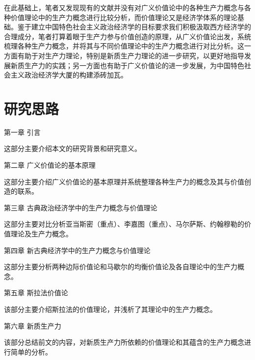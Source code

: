 在此基础上，笔者又发现现有的文献并没有对广义价值论中的各种生产力概念与各种价值理论中的生产力概念进行比较分析，而价值理论又是经济学体系的理论基础\cite[118]{CaiJiMingCongGuDianZhengZhiJingJiXueDaoZhongGuoTeSeSheHuiZhuYiZhengZhiJingJiXueJiYuZhongGuoShiJiaoDeZhengZhiJingJiXueYanBianShangCe2023}。鉴于建立中国特色社会主义政治经济学的目标要求我们积极汲取西方经济学的合理成分\cite[81]{ChengEnFuChongJianZhongGuoJingJiXueChaoYueMaKeSiYuXiFangJingJiXue2000}，笔者打算着眼于生产力参与价值创造的原理，从广义价值论出发，系统梳理各种生产力概念，并将其与不同价值理论中的生产力概念进行对比分析。这一方面有助于对生产力理论，特别是新质生产力理论的进一步研究，以更好地指导发展新质生产力的实践；另一方面也有助于广义价值论的进一步发展，为中国特色社会主义政治经济学大厦的构建添砖加瓦。


\section{研究思路}

第一章 \quad 引言

这部分主要介绍本文的研究背景和研究意义。

第二章 \quad 广义价值论的基本原理

这部分主要介绍广义价值论的基本原理并系统整理各种生产力的概念及其与价值创造的联系。

第三章 \quad 古典政治经济学中的生产力概念与价值理论

这部分主要对比分析亚当斯密（重点）、李嘉图（重点）、马尔萨斯、约翰穆勒的价值理论及生产力概念。

第四章 \quad 新古典经济学中的生产力概念与价值理论

这部分主要分析两种边际价值论和马歇尔的均衡价值论及各自理论中的生产力概念。

第五章 \quad 斯拉法价值论

该部分主要介绍斯拉法的价值理论，并浅析了其理论中的生产力概念。

第六章 \quad 新质生产力

该部分总结前文的内容，对新质生产力所依赖的价值理论和其蕴含的生产力概念进行简单的分析。

